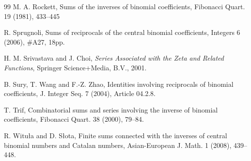 \documentclass[11pt,reqno]{amsart}
\theoremstyle{plain}
\numberwithin{equation}{section}
\begin{document}
\begin{thebibliography}{99}
M. A. Rockett, Sums of the inverses of binomial coefficients, Fibonacci Quart. 19 (1981), 433--445

R. Sprugnoli, Sums of reciprocals of the central binomial coefficients, Integers 6 (2006), \#A27, 18pp.

H. M. Srivastava and J. Choi, \emph{Series Associated with the Zeta and Related Functions}, Springer Science+Media, B.V., 2001.

B. Sury, T. Wang and F.-Z. Zhao, Identities involving reciprocals of binomial coefficients, J. Integer Seq. 7 (2004), Article 04.2.8. 

T. Trif, Combinatorial sums and series involving the inverse of binomial coefficients, Fibonacci Quart. 38 (2000), 79--84.

R. Witu\l a and D. S\l ota, Finite sums connected with the inverses of central binomial numbers and Catalan numbers, 
Asian-European J. Math. 1 (2008), 439--448.

\end{thebibliography}
\end{document}
